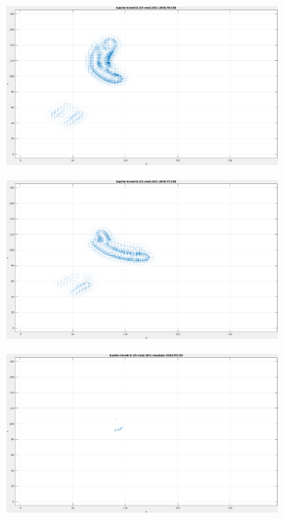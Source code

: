 \begin{appendix}
\begin{figure}[tb]
\centering
\begin{subfigure}{.45\textwidth}
  \centering
  \includegraphics[height=.6\linewidth]{figs/baelle/baelle-1.png}
  \caption{}
\end{subfigure}
\begin{subfigure}{.45\textwidth}
  \centering
  \includegraphics[height=.6\linewidth]{figs/baelle/baelle-2.png}
  \caption{}
\end{subfigure}
\begin{subfigure}{.45\textwidth}
  \includegraphics[height=.6\linewidth]{figs/baelle/baelle-masked-1.png}

\end{subfigure}
\end{figure}
\end{appendix}

